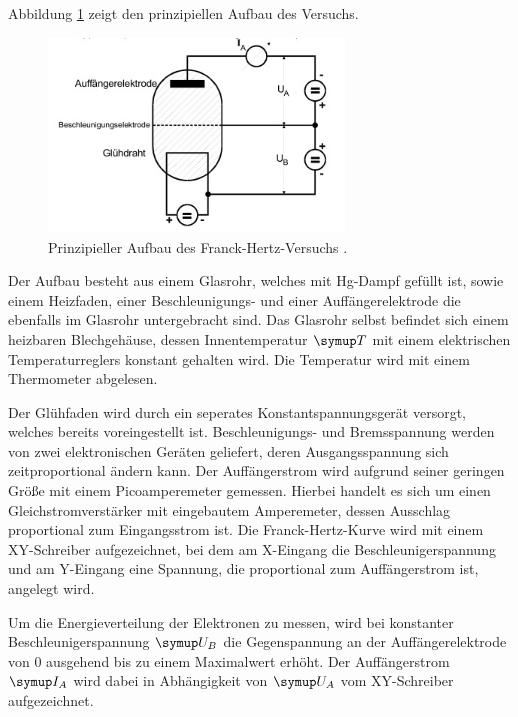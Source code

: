 Abbildung \ref{fig:aufbau} zeigt den prinzipiellen Aufbau des Versuchs.
\begin{figure}
  \centering
  \includegraphics[width=0.7\textwidth]{bilder/aufbau.jpg}
  \caption{Prinzipieller Aufbau des Franck-Hertz-Versuchs \cite{601}.}
  \label{fig:aufbau}
\end{figure}
Der Aufbau besteht aus einem Glasrohr, welches mit Hg-Dampf gefüllt ist,
sowie einem Heizfaden, einer Beschleunigungs- und einer Auffängerelektrode
die ebenfalls im Glasrohr untergebracht sind.
Das Glasrohr selbst befindet sich einem heizbaren Blechgehäuse, dessen
Innentemperatur $\su{T}$ mit einem elektrischen Temperaturreglers konstant
gehalten wird. Die Temperatur wird mit einem Thermometer abgelesen.

Der Glühfaden wird durch ein seperates Konstantspannungsgerät versorgt, welches
bereits voreingestellt ist. Beschleunigungs- und Bremsspannung werden von
zwei elektronischen Geräten geliefert, deren Ausgangsspannung sich
zeitproportional ändern kann. Der Auffängerstrom wird aufgrund seiner geringen Größe
mit einem Picoamperemeter gemessen. Hierbei handelt es sich um einen
Gleichstromverstärker mit eingebautem Amperemeter, dessen Ausschlag proportional
zum Eingangsstrom ist. Die Franck-Hertz-Kurve wird mit einem XY-Schreiber
aufgezeichnet, bei dem am X-Eingang die Beschleunigerspannung und am Y-Eingang
eine Spannung, die proportional zum Auffängerstrom ist, angelegt wird.

Um die Energieverteilung der
Elektronen zu messen, wird bei konstanter Beschleunigerspannung $\su{U_B}$ die
Gegenspannung an der Auffängerelektrode von 0 ausgehend bis zu einem Maximalwert
erhöht. Der Auffängerstrom $\su{I_A}$ wird dabei in Abhängigkeit von $\su{U_A}$
vom XY-Schreiber aufgezeichnet.

